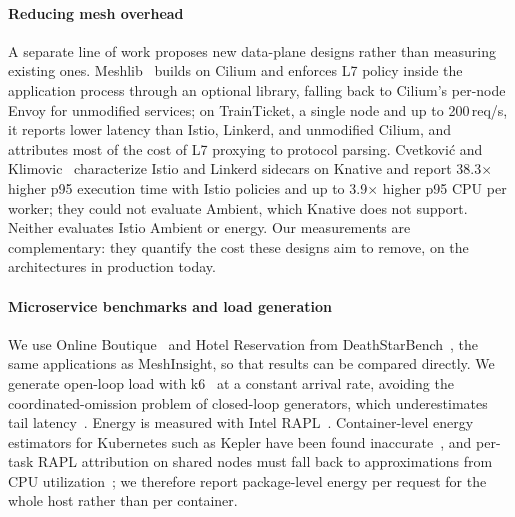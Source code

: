 \paragraph{Reducing mesh overhead}
A separate line of work proposes new data-plane designs rather than measuring
existing ones. Meshlib~\cite{mostafaei2026meshlib} builds on Cilium and enforces
L7 policy inside the application process through an optional library, falling
back to Cilium's per-node Envoy for unmodified services; on TrainTicket, a
single node and up to 200\,req/s, it reports lower latency than Istio, Linkerd,
and unmodified Cilium, and attributes most of the cost of L7 proxying to
protocol parsing. Cvetkovi\'c and Klimovic~\cite{cvetkovic2025lightweight}
characterize Istio and Linkerd sidecars on Knative and report 38.3$\times$
higher p95 execution time with Istio policies and up to 3.9$\times$ higher p95
CPU per worker; they could not evaluate Ambient, which Knative does not
support. Neither evaluates Istio Ambient or energy. Our measurements are complementary: they quantify the cost these
designs aim to remove, on the architectures in production today.

\paragraph{Microservice benchmarks and load generation}
We use Online Boutique~\cite{onlineboutique} and Hotel Reservation from
DeathStarBench~\cite{gan2019deathstarbench}, the same applications as
MeshInsight, so that results can be compared directly. We generate open-loop
load with k6~\cite{k6} at a constant arrival rate, avoiding the
coordinated-omission problem of closed-loop generators, which underestimates
tail latency~\cite{tene2015latency}. Energy is measured with Intel
RAPL~\cite{khan2018rapl}.
Container-level energy estimators for Kubernetes such as Kepler have been
found inaccurate~\cite{pijnacker2025kepler}, and per-task RAPL attribution on
shared nodes must fall back to approximations from CPU
utilization~\cite{thamm2025rapl}; we therefore report package-level energy per
request for the whole host rather than per container.

